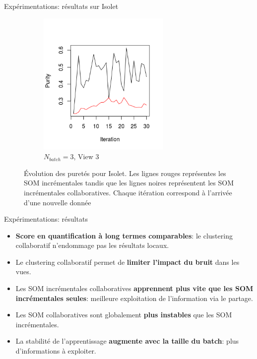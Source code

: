 \documentclass[hyperref={pdfpagelabels=false}]{beamer}
\begin{document}
\begin{frame}{Expérimentations: résultats sur Isolet}
\begin{figure}[!h]
\begin{subfigure}[b]{0.3\textwidth}
                    \centering
                    \includegraphics[width=0.7\textwidth, trim= 0cm 0.5cm 1cm 2cm, clip]{img/p3.png}
                    \caption{$N_{batch}=3$, View 3}
                \end{subfigure}
                \caption{Évolution des puretés pour Isolet.  Les lignes rouges représentes les SOM incrémentales tandis que les lignes noires représentent les SOM incrémentales collaboratives.  Chaque itération correspond à l'arrivée d'une nouvelle donnée}
            \end{figure}
        \end{frame}

        \begin{frame}{Expérimentations: résultats}
            \begin{itemize}
                \item \textbf{Score en quantification à long termes 
                    comparables}: le
                    clustering collaboratif n'endommage pas les 
                    résultats
                    locaux.
                \item Le clustering collaboratif permet de 
                    \textbf{limiter l'impact
                    du bruit} dans les vues.
                \item Les SOM incrémentales collaboratives 
                    \textbf{apprennent plus
                    vite que les SOM incrémentales seules}: meilleure
                    exploitation de l'information via le partage.
                \item Les SOM collaboratives sont globalement 
                    \textbf{plus instables} que les SOM incrémentales.
                \item La stabilité de l'apprentissage \textbf{augmente 
                    avec la taille du batch}: plus d'informations à 
                    exploiter.
            \end{itemize}
        \end{frame}
\end{document}
